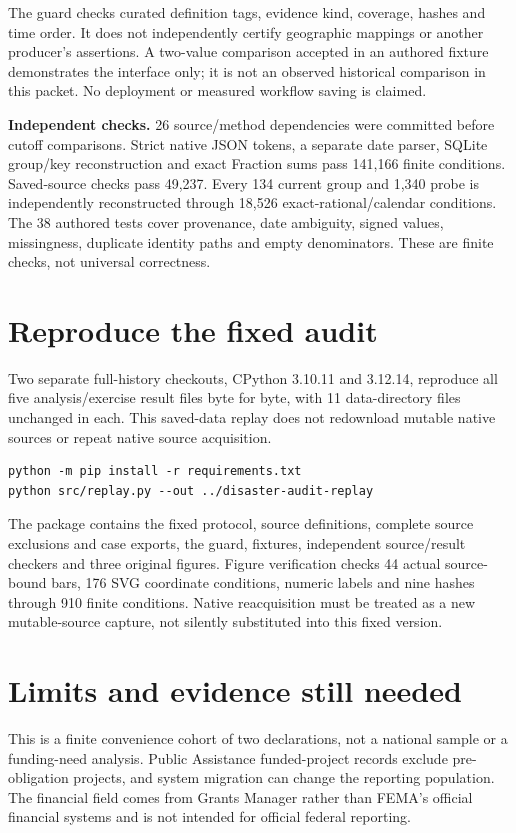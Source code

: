 \documentclass[11pt,letterpaper]{article}
\newcommand{\ProbeCount}{1,340}
\newcommand{\CurrentGroups}{134}
\newcommand{\NativeChecks}{141,166}
\newcommand{\SavedChecks}{49,237}
\newcommand{\ProbeChecks}{18,526}
\newcommand{\FixtureCount}{38}
\newcommand{\FreezeCount}{26}
\newcommand{\FigureChecks}{910}
\newcommand{\FigureBars}{44}
\newcommand{\SvgCoordinates}{176}
\newcommand{\PythonOld}{3.10.11}
\newcommand{\PythonNew}{3.12.14}
\newcommand{\ReplaySources}{11}
\begin{document}
The guard checks curated definition tags, evidence kind, coverage, hashes and time order. It does not independently certify geographic mappings or another producer's assertions. A two-value comparison accepted in an authored fixture demonstrates the interface only; it is not an observed historical comparison in this packet. No deployment or measured workflow saving is claimed.

\textbf{Independent checks.} \FreezeCount{} source/method dependencies were committed before cutoff comparisons. Strict native JSON tokens, a separate date parser, SQLite group/key reconstruction and exact Fraction sums pass \NativeChecks{} finite conditions. Saved-source checks pass \SavedChecks{}. Every \CurrentGroups{} current group and \ProbeCount{} probe is independently reconstructed through \ProbeChecks{} exact-rational/calendar conditions. The \FixtureCount{} authored tests cover provenance, date ambiguity, signed values, missingness, duplicate identity paths and empty denominators. These are finite checks, not universal correctness.
\newpage

\section*{Reproduce the fixed audit}
Two separate full-history checkouts, CPython \PythonOld{} and \PythonNew{}, reproduce all five analysis/exercise result files byte for byte, with \ReplaySources{} data-directory files unchanged in each. This saved-data replay does not redownload mutable native sources or repeat native source acquisition.

\begin{verbatim}
python -m pip install -r requirements.txt
python src/replay.py --out ../disaster-audit-replay
\end{verbatim}

The package contains the fixed protocol, source definitions, complete source exclusions and case exports, the guard, fixtures, independent source/result checkers and three original figures. Figure verification checks \FigureBars{} actual source-bound bars, \SvgCoordinates{} SVG coordinate conditions, numeric labels and nine hashes through \FigureChecks{} finite conditions. Native reacquisition must be treated as a new mutable-source capture, not silently substituted into this fixed version.

\section*{Limits and evidence still needed}
This is a finite convenience cohort of two declarations, not a national sample or a funding-need analysis. Public Assistance funded-project records exclude pre-obligation projects, and system migration can change the reporting population. The financial field comes from Grants Manager rather than FEMA's official financial systems and is not intended for official federal reporting.
\end{document}
